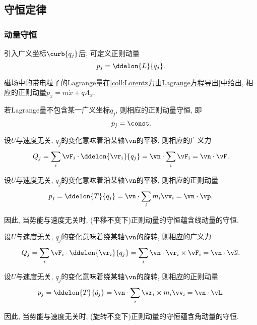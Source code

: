 \documentclass[../TheoreticalMechanics.tex]{subfiles}
\begin{document}

\subsection{守恒定律} %
\label{sub:守恒定律}

\subsubsection{动量守恒} %
\label{ssub:动量守恒}

\begin{definition}[正则动量]
	引入广义坐标$\curb{q_j}$后, 可定义正则动量
	\[ p_j = \ddelon{L}{\dot{q}_j}. \]
\end{definition}
\begin{ex}
	磁场中的带电粒子的Lagrange量在\cref{coll:Lorentz力由Lagrange方程导出}中给出, 相应的正则动量$p_x = m\dot{x} + qA_x$.
\end{ex}
\begin{finale}
	\begin{corollary}[动量守恒]
		若Lagrange量不包含某一广义坐标$q_j$, 则相应的正则动量守恒, 即
		\[ p_j = \const. \]
	\end{corollary}
\end{finale}
\begin{corollary}[(线)广义力的意义]
	设$U$与速度无关, $q_j$的变化意味着沿某轴$\vn$的平移, 则相应的广义力
	\[ Q_j = \sum_i \vF_i\cdot\ddelon{\vr_i}{q_j} = \vn\cdot\sum_i \vF_i = \vn\cdot\vF. \]
\end{corollary}
\begin{corollary}[(线)正则动量的意义]
	设$U$与速度无关, $q_j$的变化意味着沿某轴$\vn$的平移, 则相应的正则动量
	\[ p_j = \ddelon{T}{\dot{q}_j} = \vn\cdot\sum_i m_i\vv_i = \vn\cdot\vp. \]
\end{corollary}
\begin{remark}
	因此, 当势能与速度无关时, (平移不变下)正则动量的守恒蕴含线动量的守恒.
\end{remark}
\begin{corollary}[(角)广义力的意义]
	设$U$与速度无关, $q_j$的变化意味着绕某轴$\vn$的旋转, 则相应的广义力
	\[ Q_j = \sum_i \vF_i\cdot\ddelon{\vr_i}{q_j} = \sum_i \vn\cdot\vr_i\times\vF_i = \vn\cdot\vN. \]
\end{corollary}
\begin{corollary}[(角)正则动量的意义]
	设$U$与速度无关, $q_j$的变化意味着绕某轴$\vn$的旋转, 则相应的正则动量
	\[ p_j = \ddelon{T}{\dot{q}_j} = \vn\cdot\sum_i \vr_i \times m_i\vv_i = \vn\cdot\vL. \]
\end{corollary}
\begin{remark}
	因此, 当势能与速度无关时, (旋转不变下)正则动量的守恒蕴含角动量的守恒.
\end{remark}
\end{document}
